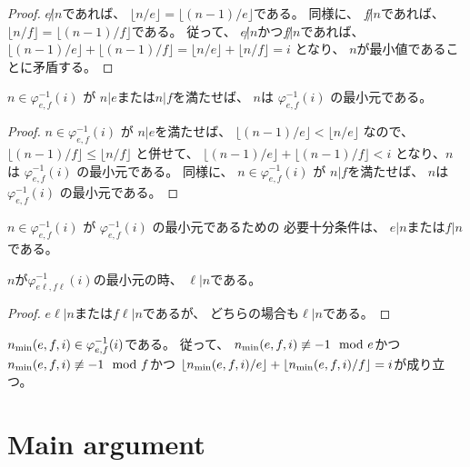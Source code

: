\begin{proof}
$e \not | n$であれば、
$\lfloor n / e \rfloor = \lfloor (n-1) / e \rfloor$である。
同様に、
$f \not | n$であれば、
$\lfloor n / f \rfloor = \lfloor (n-1) / f \rfloor$である。
従って、
$e \not | n$かつ$f \not | n$であれば、
$
\lfloor (n-1) / e \rfloor + \lfloor (n-1) / f \rfloor
= \lfloor n / e \rfloor + \lfloor n / f \rfloor
= i
$
となり、
$n$が最小値であることに矛盾する。
\end{proof}

\begin{lemma}
\label{lm:dvd_min_φinv}
$n \in \varphi_{e,f}^{-1}(i)$
が
$n | e$または$n | f$を満たせば、
$n$は
$\varphi_{e,f}^{-1}(i)$
の最小元である。
\end{lemma}

\begin{proof}
$n \in \varphi_{e,f}^{-1}(i)$
が
$n | e$を満たせば、
$
\lfloor (n-1) / e \rfloor < \lfloor n / e \rfloor
$
なので、
$
\lfloor (n-1) / f \rfloor \le \lfloor n / f \rfloor
$
と併せて、
$\lfloor (n-1) / e \rfloor + \lfloor (n-1) / f \rfloor < i$
となり、$n$は
$\varphi_{e,f}^{-1}(i)$
の最小元である。
同様に、
$n \in \varphi_{e,f}^{-1}(i)$
が
$n | f$を満たせば、
$n$は
$\varphi_{e,f}^{-1}(i)$
の最小元である。
\end{proof}

\begin{lemma}
$n \in \varphi_{e,f}^{-1}(i)$
が
$\varphi_{e,f}^{-1}(i)$
の最小元であるための
必要十分条件は、
$e | n$または$f | n$である。
\end{lemma}

\begin{lemma}
\label{lm:gcd_div_min_φinv}
\leanok
$n$が$\varphi_{e \ell, f \ell}^{-1}(i)$の最小元の時、
$\ell | n$である。
\end{lemma}

\begin{proof}
$e \ell| n$または$f \ell| n$であるが、
どちらの場合も$\ell | n$である。
\end{proof}

$n_{\mathrm{min}}(e,f,i) \in \varphi_{e,f}^{-1}(i)$である。
従って、
$n_{\mathrm{min}}(e,f,i) \not \equiv -1 \mod e$かつ
$n_{\mathrm{min}}(e,f,i) \not \equiv -1 \mod f$かつ
$\lfloor n_{\mathrm{min}}(e,f,i) / e \rfloor + \lfloor n_{\mathrm{min}}(e,f,i) / f \rfloor = i$が成り立つ。

\chapter{Main argument}

